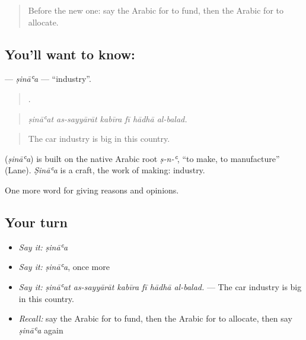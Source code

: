 \label{lesson:AR-C384-sinaa}



\begin{quote}
Before the new one: say the Arabic for to fund, then the Arabic for to allocate.
\end{quote}

\subsection*{You'll want to know: }
\textbf{} — \emph{ṣināʿa} — \textquotedblleft{}industry\textquotedblright{}.

\begin{quote}
     .
\end{quote}

\begin{quote}
\emph{ṣināʿat as-sayyārāt kabīra fī hādhā al-balad.}
\end{quote}

\begin{quote}
The car industry is big in this country.
\end{quote}

\begin{cousinweb}
\textbf{} (\emph{ṣināʿa}) is built on the native Arabic root \emph{ṣ-n-ʿ}, \textquotedblleft{}to make, to manufacture\textquotedblright{} (Lane). \emph{Ṣināʿa} is a craft, the work of making: industry.
\end{cousinweb}

\begin{grammarlens}[title={What you've built}]
One more word for giving reasons and opinions.
\end{grammarlens}

\subsection*{Your turn}
\begin{itemize}
\raggedright
  \item \emph{Say it:} \emph{ṣināʿa}
  \item \emph{Say it:} \emph{ṣināʿa}, once more
  \item \emph{Say it:} \emph{ṣināʿat as-sayyārāt kabīra fī hādhā al-balad.} — The car industry is big in this country.
  \item \emph{Recall:} say the Arabic for to fund, then the Arabic for to allocate, then say \emph{ṣināʿa} again
\end{itemize}

